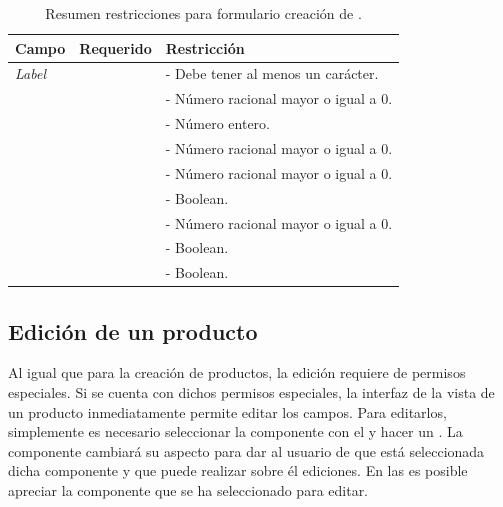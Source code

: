 		\begin{table}[H] 
		    \centering
			\begin{tabular}{ |l|c||l| }
				\hline Campo & Requerido & Restricción \\ \hline
				\multirow{1}{*}{\textit{Label}}		&  \multirow{1}{*}{\checkmark} 	& - Debe tener al menos un carácter. \\ \hline
				\multirow{1}{*}{\textit{\WeightForm}}	&  \multirow{1}{*}{\checkmark} 	& - Número racional mayor o igual a 0. \\ \hline
				\multirow{1}{*}{\quantityForm}	&  \multirow{1}{*}{\checkmark} 	& - Número entero. \\ \hline
				\multirow{1}{*}{\msrpSIGLAS}		&  \multirow{1}{*}{} 			& - Número racional mayor o igual a 0. \\ \hline
				\multirow{1}{*}{\priceForm}		&  \multirow{1}{*}{\checkmark} 	& - Número racional mayor o igual a 0. \\ \hline
				\multirow{1}{*}{\denyForm}		&  \multirow{1}{*}{\checkmark} 	& - Boolean. \\ \hline
				\multirow{1}{*}{\warnForm}		&  \multirow{1}{*}{} 			& - Número racional mayor o igual a 0. \\ \hline
				\multirow{1}{*}{\taxableForm}	&  \multirow{1}{*}{\checkmark} 	& - Boolean. \\ \hline
				\multirow{1}{*}{\trackingForm}	&  \multirow{1}{*}{\checkmark} 	& - Boolean. \\ \hline
			\end{tabular}
		 	\caption{Resumen restricciones para formulario creación de \optionsForm.}
		    \label{tab:solution:products:create:form:product:generic:options}
		\end{table}

	\subsection{Edición de un producto}\label{chapter:section:productos:subsection:edicion}

		Al igual que para la creación de productos, la edición requiere de permisos especiales. Si se cuenta con dichos permisos especiales, la interfaz de la vista de un producto inmediatamente permite editar los campos. Para editarlos, simplemente es necesario seleccionar la componente con el \mousePC y hacer un \click. La componente cambiará su aspecto para dar \feedback al usuario de que está seleccionada dicha componente y que puede realizar sobre él ediciones. En las  es posible apreciar la componente que se ha seleccionado para editar.

